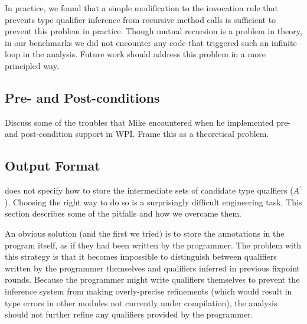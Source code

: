 In practice, we found that a simple modification to the invocation rule that
prevents type qualifier inference from recursive method calls is sufficient
to prevent this problem in practice. Though mutual recursion is a problem in
theory, in our benchmarks we did not encounter any code that triggered such
an infinite loop in the analysis. Future work should address this problem in
a more principled way.

\subsection{Pre- and Post-conditions}
\label{sec:pre-post-conditions}

Discuss some of the troubles that Mike encountered when
he implemented pre- and post-condition support in WPI. Frame
this as a theoretical problem. 

\subsection{Output Format}
\label{sec:output}


 does not specify how to store the intermediate
sets of candidate type qualfiers (\ie $A^{\prime}$). Choosing the right way
to do so is a surprisingly difficult engineering task. This section describes some
of the pitfalls and how we overcame them.

An obvious solution (and the first we tried) is to store the annotations
in the program itself, as if they had been written by the programmer. The
problem with this strategy is that it becomes impossible to distinguish
between qualifiers written by the programmer themselves and qualifiers
inferred in previous fixpoint rounds. Because the programmer might write
qualifiers themselves to prevent the inference system from making overly-precise
refinements (which would result in type errors in \eg other modules not currently
under compilation), the analysis should not further refine any qualifiers
provided by the programmer.


